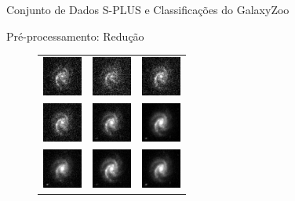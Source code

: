 \documentclass[10pt,xcolor=svgnames]{beamer}
\begin{document}
\begin{frame}{Conjunto de Dados}
S-PLUS e Classificações do GalaxyZoo
\end{frame}

\begin{frame}{Pré-processamento: Redução}
  \vspace{2mm}
  \begin{minipage}{0.48\textwidth}
    \begin{figure}
      \begin{tabular}{ccc}
        \includegraphics[width=13mm]{imgs/F378.png} &
        \includegraphics[width=13mm]{imgs/F395.png} &
        \includegraphics[width=13mm]{imgs/F410.png}   \\
        \includegraphics[width=13mm]{imgs/F430.png} &
        \includegraphics[width=13mm]{imgs/F515.png} &
        \includegraphics[width=13mm]{imgs/F660.png}   \\
        \includegraphics[width=13mm]{imgs/F861.png} &
        \includegraphics[width=13mm]{imgs/G.png}    &
        \includegraphics[width=13mm]{imgs/I.png}      \\

\end{tabular}
\end{figure}
\end{minipage}
\end{frame}
\end{document}
